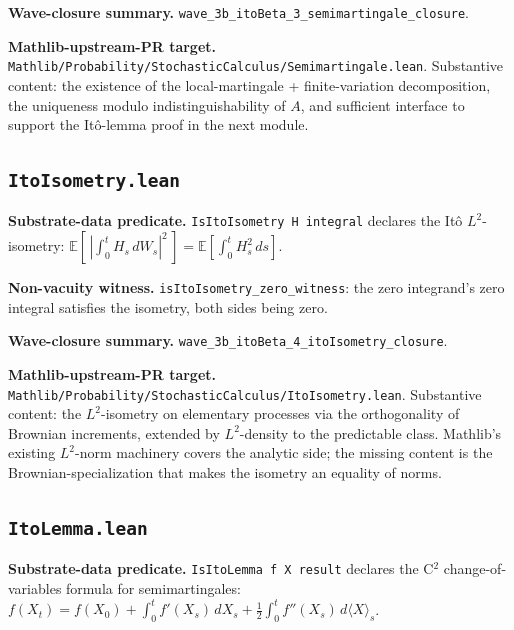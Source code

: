 \documentclass[11pt]{article}
\begin{document}
\textbf{Wave-closure summary.}
\texttt{wave\_3b\_itoBeta\_3\_semimartingale\_closure}.

\textbf{Mathlib-upstream-PR target.}
\texttt{Mathlib/Probability/StochasticCalculus/Semimartingale.lean}.
Substantive content: the existence of the local-martingale +
finite-variation decomposition, the uniqueness modulo
indistinguishability of $A$, and sufficient interface to support
the It\^o-lemma proof in the next module.

\subsection{\texttt{ItoIsometry.lean}}

\textbf{Substrate-data predicate.}
\texttt{IsItoIsometry H integral} declares the It\^o $L^2$-isometry:
$\mathbb{E}\left[\,\left|\int_0^t H_s\,dW_s\right|^2\,\right]
= \mathbb{E}\left[\int_0^t H_s^2\,ds\right]$.

\textbf{Non-vacuity witness.}
\texttt{isItoIsometry\_zero\_witness}: the zero integrand's zero
integral satisfies the isometry, both sides being zero.

\textbf{Wave-closure summary.}
\texttt{wave\_3b\_itoBeta\_4\_itoIsometry\_closure}.

\textbf{Mathlib-upstream-PR target.}
\texttt{Mathlib/Probability/StochasticCalculus/ItoIsometry.lean}.
Substantive content: the $L^2$-isometry on elementary processes
via the orthogonality of Brownian increments, extended by
$L^2$-density to the predictable class. Mathlib's existing $L^2$-norm
machinery covers the analytic side; the missing content is the
Brownian-specialization that makes the isometry an equality of
norms.

\subsection{\texttt{ItoLemma.lean}}

\textbf{Substrate-data predicate.}
\texttt{IsItoLemma f X result} declares the C${}^2$
change-of-variables formula for semimartingales:
$f(X_t) = f(X_0) + \int_0^t f'(X_s)\,dX_s + \frac{1}{2}\int_0^t f''(X_s)\,d\langle X\rangle_s$.
\end{document}

